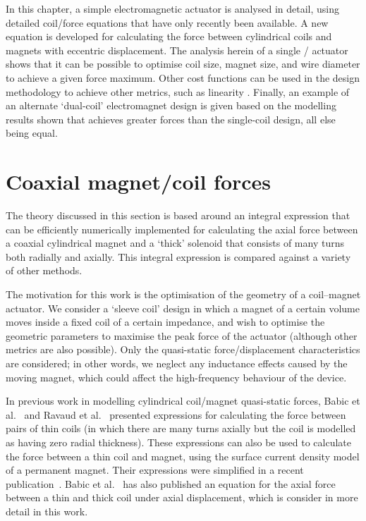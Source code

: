 \documentclass[11pt,a4paper]{memoir}
\begin{document}
In this chapter, a simple electromagnetic actuator is analysed in detail, using detailed coil/force equations that have only recently been available.
A new equation is developed for calculating the force between cylindrical coils and magnets with eccentric displacement.
The analysis herein of a single \dof/ actuator shows that it can be possible to optimise coil size, magnet size, and wire diameter to achieve a given force maximum.
Other cost functions can be used in the design methodology to achieve other metrics, such as linearity \cite{merit2009-ietm}.
Finally, an example of an alternate `dual-coil' electromagnet design is given based on the modelling results shown that achieves greater forces than the single-coil design, all else being equal.


\section{Coaxial magnet/coil forces}

The theory discussed in this section is based around an integral expression that can be efficiently numerically implemented for calculating the axial force between a coaxial cylindrical magnet and a `thick' solenoid that consists of many turns both radially and axially.
This integral expression is compared against a variety of other methods.

The motivation for this work is the optimisation of the geometry of a coil--magnet actuator.
We consider a `sleeve coil' design in which a magnet of a certain volume moves inside a fixed coil of a certain impedance, and wish to optimise the geometric parameters to maximise the peak force of the actuator (although other metrics are also possible).
Only the quasi-static force/displacement characteristics are considered; in other words, we neglect any inductance effects caused by the moving magnet, which could affect the high-frequency behaviour of the device.

In previous work in modelling cylindrical coil/magnet quasi-static forces, Babic et al.~\cite{babic2008-ietm} and Ravaud et al.~\cite{ravaud2010-pier} presented expressions for calculating the force between pairs of thin coils (in which there are many turns axially but the coil is modelled as having zero radial thickness). These expressions can also be used to calculate the force between a thin coil and magnet, using the surface current density model of a permanent magnet.
Their expressions were simplified in a recent publication~\cite{robertson2011-ietm}.
Babic et al.~\cite{babic2011-ietm} has also published an equation for the axial force between a thin and thick coil under axial displacement, which is consider in more detail in this work.
\end{document}
